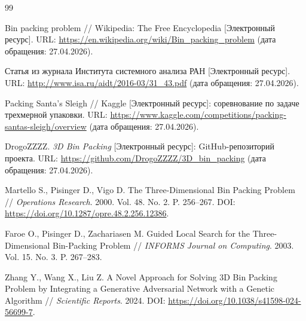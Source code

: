 \documentclass[14pt,a4paper]{extarticle}
\begin{document}
\begin{thebibliography}{99}

Bin packing problem // Wikipedia: The Free Encyclopedia [Электронный ресурс]. URL: \url{https://en.wikipedia.org/wiki/Bin_packing_problem} (дата обращения: 27.04.2026).

Статья из журнала Института системного анализа РАН [Электронный ресурс]. URL: \url{http://www.isa.ru/aidt/2016-03/31_43.pdf} (дата обращения: 27.04.2026).

Packing Santa's Sleigh // Kaggle [Электронный ресурс]: соревнование по задаче трехмерной упаковки. URL: \url{https://www.kaggle.com/competitions/packing-santas-sleigh/overview} (дата обращения: 27.04.2026).

DrogoZZZZ. \textit{3D Bin Packing} [Электронный ресурс]: GitHub-репозиторий проекта. URL: \url{https://github.com/DrogoZZZZ/3D_bin_packing} (дата обращения: 27.04.2026).

Martello S., Pisinger D., Vigo D. The Three-Dimensional Bin Packing Problem // \textit{Operations Research}. 2000. Vol. 48. No. 2. P. 256--267. DOI: \url{https://doi.org/10.1287/opre.48.2.256.12386}.

Faroe O., Pisinger D., Zachariasen M. Guided Local Search for the Three-Dimensional Bin-Packing Problem // \textit{INFORMS Journal on Computing}. 2003. Vol. 15. No. 3. P. 267--283.

Zhang Y., Wang X., Liu Z. A Novel Approach for Solving 3D Bin Packing Problem by Integrating a Generative Adversarial Network with a Genetic Algorithm // \textit{Scientific Reports}. 2024. DOI: \url{https://doi.org/10.1038/s41598-024-56699-7}.

\end{thebibliography}
\end{document}
